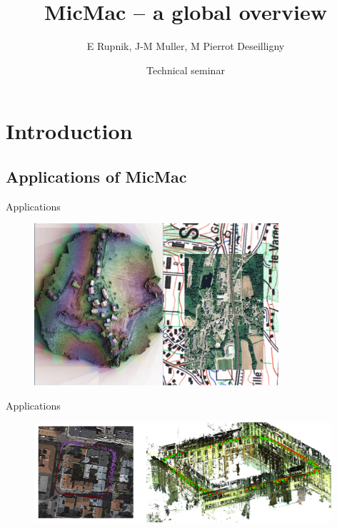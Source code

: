 \documentclass{beamer}
\title{MicMac -- a global overview}
\institute{IGN}
\date[25 May 2018]{Technical seminar}
\author[E Rupnik]{E Rupnik, J-M Muller, M Pierrot Deseilligny}
\begin{document}
    \begin{frame}[plain]
        \titlepage{}
    \end{frame}

	\tableofcontents
	

	
	
      \section{Introduction}  
      	\subsection*{Applications of MicMac}
		\begin{frame}{Applications}
		 
			\begin{figure}
			  \includegraphics[height=6cm]{../MicmacQuickMay2018/images/usage2}
			\end{figure}
		\end{frame}	
		
		\begin{frame}{Applications}
			\begin{figure}
			  \includegraphics[width=11cm]{images/trajectory.png}
			\end{figure}
		\end{frame}	
		
\end{document}
